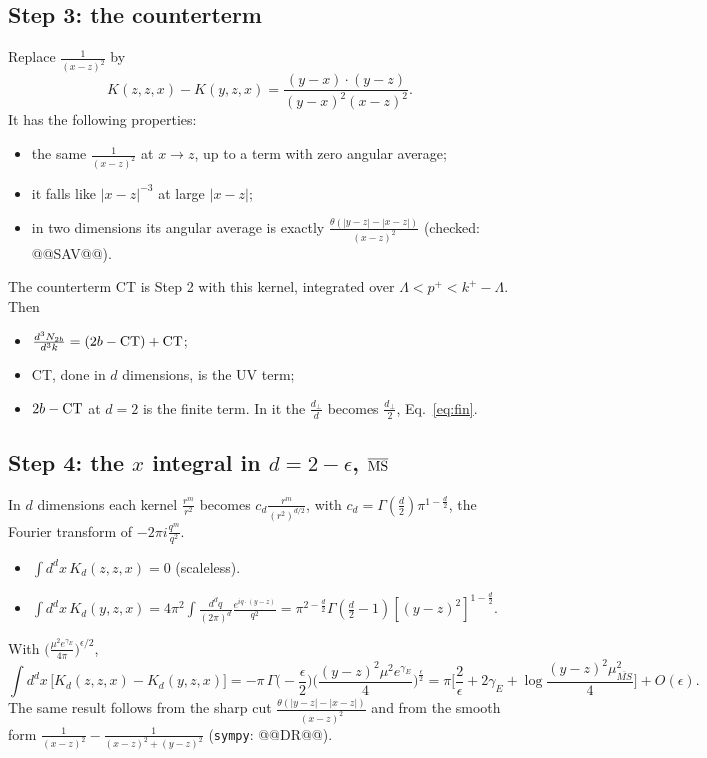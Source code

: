 \documentclass[10pt]{article}
\numberwithin{equation}{section}
\begin{document}
\subsection*{Step 3: the counterterm}
Replace $\frac{1}{(x-z)^2}$ by
\begin{equation}
K(z,z,x)-K(y,z,x)=\frac{(y-x)\cdot(y-z)}{(y-x)^{2}(x-z)^{2}} .
\end{equation}
It has the following properties:
\begin{itemize}
\item the same $\frac{1}{(x-z)^2}$ at $x\to z$, up to a term with zero angular average;
\item it falls like $|x-z|^{-3}$ at large $|x-z|$;
\item in two dimensions its angular average is exactly $\frac{\theta(|y-z|-|x-z|)}{(x-z)^2}$ (checked: @@SAV@@).
\end{itemize}
The counterterm CT is Step 2 with this kernel, integrated over $\Lambda<p^+<k^+-\Lambda$. Then
\begin{itemize}
\item $\frac{d^3N_{2b}}{d^3k}=(2b-{\rm CT})+{\rm CT}$;
\item CT, done in $d$ dimensions, is the UV term;
\item $2b-{\rm CT}$ at $d=2$ is the finite term. In it the $\frac{d_\perp}{d}$ becomes $\frac{d_\perp}{2}$, Eq.~\eqref{eq:fin}.
\end{itemize}

\subsection*{Step 4: the \texorpdfstring{$x$}{x} integral in \texorpdfstring{$d=2-\epsilon$}{d=2-eps}, \texorpdfstring{$\overline{\rm MS}$}{MS-bar}}
In $d$ dimensions each kernel $\frac{r^m}{r^2}$ becomes $c_d\frac{r^m}{(r^2)^{d/2}}$, with $c_d=\Gamma(\frac d2)\pi^{1-\frac d2}$, the Fourier transform of $-2\pi i\frac{q^m}{q^2}$.
\begin{itemize}
\item $\int d^dx\,K_d(z,z,x)=0$ (scaleless).
\item $\int d^dx\,K_d(y,z,x)=4\pi^2\int\frac{d^dq}{(2\pi)^d}\frac{e^{iq\cdot(y-z)}}{q^2}=\pi^{2-\frac d2}\Gamma(\frac d2-1)[(y-z)^2]^{1-\frac d2}$.
\end{itemize}
With $\big(\frac{\mu^2e^{\gamma_E}}{4\pi}\big)^{\epsilon/2}$,
\begin{equation}
\int d^dx\,\big[K_d(z,z,x)-K_d(y,z,x)\big]=-\pi\,\Gamma\Big(-\frac\epsilon2\Big)\Big(\frac{(y-z)^2\mu^2e^{\gamma_E}}{4}\Big)^{\frac\epsilon2}=\pi\Big[\frac2\epsilon+2\gamma_E+\log\frac{(y-z)^2\mu^2_{\overline{MS}}}{4}\Big]+O(\epsilon).
\label{eq:dimreg}
\end{equation}
The same result follows from the sharp cut $\frac{\theta(|y-z|-|x-z|)}{(x-z)^2}$ and from the smooth form $\frac{1}{(x-z)^2}-\frac{1}{(x-z)^2+(y-z)^2}$ (\texttt{sympy}: @@DR@@).
\end{document}
